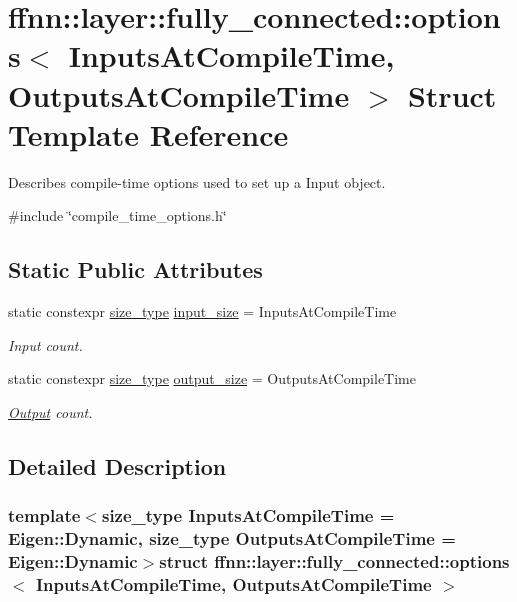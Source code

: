 \hypertarget{structffnn_1_1layer_1_1fully__connected_1_1options}{\section{ffnn\-:\-:layer\-:\-:fully\-\_\-connected\-:\-:options$<$ Inputs\-At\-Compile\-Time, Outputs\-At\-Compile\-Time $>$ Struct Template Reference}
\label{structffnn_1_1layer_1_1fully__connected_1_1options}
}


Describes compile-\/time options used to set up a Input object.  




{\ttfamily \#include \char`\"{}compile\-\_\-time\-\_\-options.\-h\char`\"{}}

\subsection*{Static Public Attributes}
\begin{DoxyCompactItemize}
\item 
static constexpr \hyperlink{namespaceffnn_a63b90a2fd70eb76684eac482a51633e5}{size\-\_\-type} \hyperlink{structffnn_1_1layer_1_1fully__connected_1_1options_ae136ed9ebf9016f397acc9f3c10c9a32}{input\-\_\-size} = Inputs\-At\-Compile\-Time
\begin{DoxyCompactList}\small\item\em Input count. \end{DoxyCompactList}\item 
static constexpr \hyperlink{namespaceffnn_a63b90a2fd70eb76684eac482a51633e5}{size\-\_\-type} \hyperlink{structffnn_1_1layer_1_1fully__connected_1_1options_a7b40e94c99dc865af66d8f2ee5a8c4cc}{output\-\_\-size} = Outputs\-At\-Compile\-Time
\begin{DoxyCompactList}\small\item\em \hyperlink{classffnn_1_1layer_1_1_output}{Output} count. \end{DoxyCompactList}\end{DoxyCompactItemize}


\subsection{Detailed Description}
\subsubsection*{template$<$size\-\_\-type Inputs\-At\-Compile\-Time = Eigen\-::\-Dynamic, size\-\_\-type Outputs\-At\-Compile\-Time = Eigen\-::\-Dynamic$>$struct ffnn\-::layer\-::fully\-\_\-connected\-::options$<$ Inputs\-At\-Compile\-Time, Outputs\-At\-Compile\-Time $>$}

